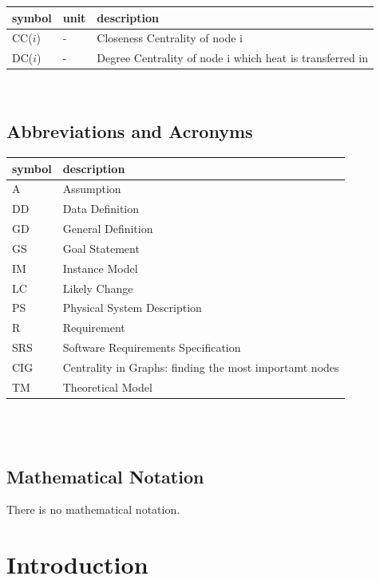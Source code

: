 \documentclass[12pt]{article}
\begin{document}
\renewcommand{\arraystretch}{1.2}
\noindent \begin{longtable*}{l l p{12cm}} \toprule
\textbf{symbol} & \textbf{unit} & \textbf{description}\\
\midrule 
CC($\mathit i$)& \si[per-mode=symbol] {-} & Closeness Centrality of node i
\\DC($\mathit i$) & \si[per-mode=symbol] {-} & Degree Centrality of node i
which heat is transferred in
\\ 
\bottomrule
\end{longtable*}
\

\subsection{Abbreviations and Acronyms}

\renewcommand{\arraystretch}{1.2}
\begin{tabular}{l l} 
  \toprule		
  \textbf{symbol} & \textbf{description}\\
  \midrule 
  A & Assumption\\
  DD & Data Definition\\
  GD & General Definition\\
  GS & Goal Statement\\
  IM & Instance Model\\
  LC & Likely Change\\
  PS & Physical System Description\\
  R & Requirement\\
  SRS & Software Requirements Specification\\
CIG &  Centrality in Graphs: finding the most importamt nodes\\
  TM & Theoretical Model\\
  \bottomrule
\end{tabular}\\

\

\subsection{Mathematical Notation}
 There is no mathematical notation.

\section{Introduction}
\end{document}
